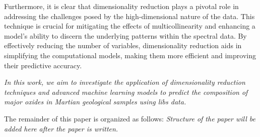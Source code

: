 Furthermore, it is clear that dimensionality reduction plays a pivotal role in addressing the challenges posed by the high-dimensional nature of the data.
This technique is crucial for mitigating the effects of multicollinearity and enhancing a model's ability to discern the underlying patterns within the spectral data.
By effectively reducing the number of variables, dimensionality reduction aids in simplifying the computational models, making them more efficient and improving their predictive accuracy.

\textit{In this work, we aim to investigate the application of dimensionality reduction techniques and advanced machine learning models to predict the composition of major oxides in Martian geological samples using \gls{libs} data.}

The remainder of this paper is organized as follows:
\textit{Structure of the paper will be added here after the paper is written.}
